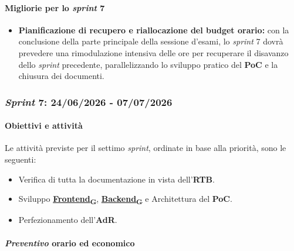 \documentclass[12pt, a4paper]{article}
\newcommand{\urlglossario}{https://skynetunigroup.github.io/Code_Guardian/Documentazione/PB/glossario_v2.0.0.pdf} %
\newcommand{\glo}[2]{\href{\urlglossario\#nameddest=#2}{#1\textsubscript{G}}}
\begin{document}
{\paragraph{Migliorie per lo \textit{sprint} 7}
\begin{itemize}
    \item \textbf{Pianificazione di recupero e riallocazione del budget orario:} con la conclusione della parte principale della sessione d'esami, lo \textit{sprint} 7 dovrà prevedere una rimodulazione intensiva delle ore per recuperare il disavanzo dello \textit{sprint} precedente, parallelizzando lo sviluppo pratico del \textbf{PoC} e la chiusura dei documenti.
\end{itemize}

\subsubsection{\textit{Sprint} 7: 24/06/2026 - 07/07/2026}

\paragraph{Obiettivi e attività}

Le attività previste per il settimo \textit{sprint}, ordinate in base alla priorità, sono le seguenti:

\begin{itemize}
    \item  Verifica di tutta la documentazione in vista dell'\textbf{RTB}.
    \item Sviluppo \textbf{\glo{Frontend}{frontend}}, \textbf{\glo{Backend}{backend}} e Architettura del \textbf{PoC}.
    \item Perfezionamento dell'\textbf{AdR}.
\end{itemize}

\paragraph{\textit{Preventivo} orario ed economico}

}
\end{document}
